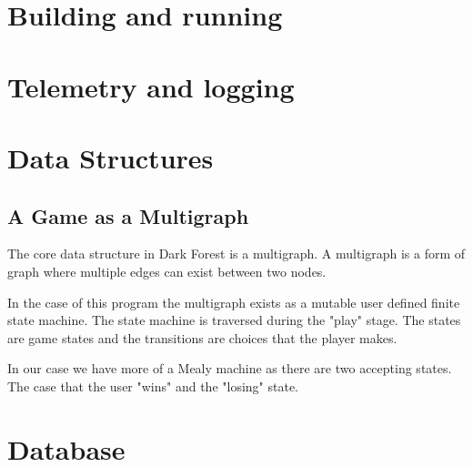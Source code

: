 \documentclass{article}
\begin{document}
\section{Building and running}
\section{Telemetry and logging}
\section{Data Structures}
\subsection{A Game as a Multigraph}
The core data structure in Dark Forest is a multigraph.
A multigraph is a form of graph where multiple edges can exist between two nodes.

In the case of this program the multigraph exists as a mutable user defined finite state machine.
The state machine is traversed during the "play" stage.
The states are game states and the transitions are choices that the player makes.

In our case we have more of a Mealy machine as there are two accepting states.
The case that the user "wins" and the "losing" state.

\section{Database}
\end{document}
